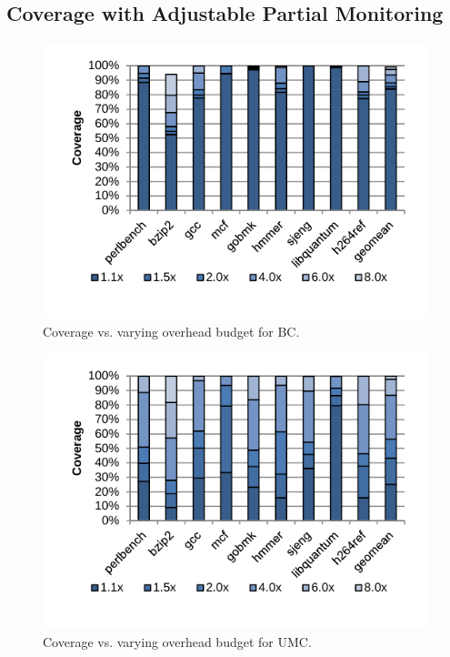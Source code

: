 \subsection{Coverage with Adjustable Partial Monitoring}

\begin{figure}
  \begin{center}
    \includegraphics[width=\linewidth, clip=true, trim=0 0.3in 0 0]{figs/data_bc_sweep.pdf}
    \vspace{-0.2in}
    \caption{Coverage vs. varying overhead budget for BC.}
    \label{fig:evaluation.bc_sweep}
    \vspace{-0.2in}
  \end{center}
\end{figure}

\begin{figure}
  \begin{center}
    \includegraphics[width=\linewidth, clip=true, trim=0 0.3in 0 0]{figs/data_umc_sweep.pdf}
    \vspace{-0.2in}
    \caption{Coverage vs. varying overhead budget for UMC.}
    \label{fig:evaluation.umc_sweep}
    \vspace{-0.1in}
  \end{center}
\end{figure}

